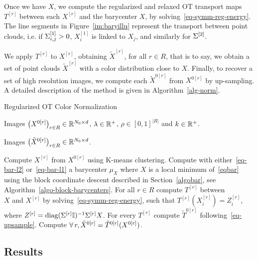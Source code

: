 Once we have $X$, we compute the regularized and relaxed OT transport maps $T^{[r]}$ between each $X^{[r]}$ and the barycenter $X$, by solving~\eqref{eq-symm-reg-energy}. The line segments in Figure~\ref{im:baryillu} represent the transport between point clouds, i.e. if $\Sigma^{[1]}_{i,j}>0$, $X^{[1]}_i$ is linked to $X_j$, and similarly for $\Sigma^{[2]}$. 

We apply $T^{[r]}$ to $X^{[r]}$, obtaining  $\tilde X^{[r]}$, for all $r \in R$, that is to say, we obtain a set of point clouds $\tilde X^{[r]}$ with a color distribution close to $X$.  Finally, to recover a set of high resolution images, we compute each $\tilde X^{0[r]}$ from $X^{0[r]}$ by up-sampling. A detailed description of the method is given in Algorithm~\ref{alg-norm}. 

\begin{algorithm}[ht!]
\caption{Regularized OT Color Normalization}
\label{alg-norm}
\Require Images $\left( X^{0[r]} \right)_{r \in R} \in \mathbb{R}^{N_0 \times d}$, $\lambda \in \mathbb{R}^+ $, $\rho \in [0,1]^{|R|}$ and $k \in \mathbb{R}^+$.

\Ensure Images $\left( \tilde X^{0[r]} \right)_{r \in R} \in \mathbb{R}^{N_0 \times d}$.
\begin{enumerate}
	 Compute $X^{[r]}$ from $X^{0[r]}$ using K-means clustering.
	 Compute with either~\eqref{eq-bar-l2} or~\eqref{eq-bar-l1} a barycenter $\mu_X$ where $X$ is a local minimum of~\eqref{eqbar} using the block coordinate descent described in Section~\ref{algobar}, see Algorithm~\ref{algo-block-barycenters}. 
	 For all $r \in R$ compute $T^{[r]}$ between \\ 
		$X$ and $X^{[r]}$ by solving~\eqref{eq-symm-reg-energy}, such that $T^{[r]}(X^{[r]}_i) = Z^{[r]}_i$, where $Z^{[r]}= \diag(\Sig^{[r]} \U)^{-1} \Sig^{[r]} X$.
	 For every $T^{[r]}$ compute $\tilde T^{0[r]}$ following~\eqref{eq-upsample}.
	 Compute $\forall \, r, \tilde X^{0[r]} = \tilde T^{0[r]}(X^{0[r]})$.
\end{enumerate}
\end{algorithm}


\subsection{Results}


